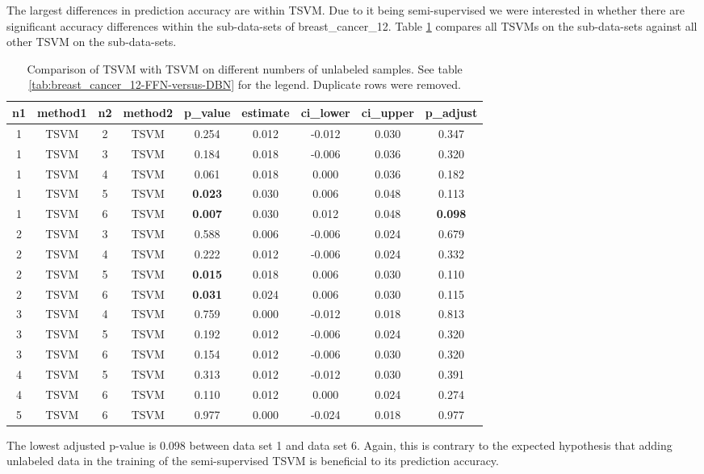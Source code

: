 The largest differences in prediction accuracy are within TSVM. Due
to it being semi-supervised we were interested in whether there are
significant accuracy differences within the sub-data-sets of breast\_cancer\_12.
Table \ref{tab:breast_cancer_12-TSVM-versus-TSVM} compares all TSVMs
on the sub-data-sets against all other TSVM on the sub-data-sets.

\begin{table}
\begin{centering}
\begin{tabular}{|c|c|c|c|c|c|c|c|c|}
\hline 
n1 & method1 & n2 & method2 & p\_value & estimate & ci\_lower & ci\_upper & p\_adjust\tabularnewline
\hline 
\hline 
1 & TSVM & 2 & TSVM & 0.254 & 0.012 & -0.012 & 0.030 & 0.347\tabularnewline
\hline 
1 & TSVM & 3 & TSVM & 0.184 & 0.018 & -0.006 & 0.036 & 0.320\tabularnewline
\hline 
1 & TSVM & 4 & TSVM & 0.061 & 0.018 & 0.000 & 0.036 & 0.182\tabularnewline
\hline 
1 & TSVM & 5 & TSVM & \textbf{0.023} & 0.030 & 0.006 & 0.048 & 0.113\tabularnewline
\hline 
1 & TSVM & 6 & TSVM & \textbf{0.007} & 0.030 & 0.012 & 0.048 & \textbf{0.098}\tabularnewline
\hline 
2 & TSVM & 3 & TSVM & 0.588 & 0.006 & -0.006 & 0.024 & 0.679\tabularnewline
\hline 
2 & TSVM & 4 & TSVM & 0.222 & 0.012 & -0.006 & 0.024 & 0.332\tabularnewline
\hline 
2 & TSVM & 5 & TSVM & \textbf{0.015} & 0.018 & 0.006 & 0.030 & 0.110\tabularnewline
\hline 
2 & TSVM & 6 & TSVM & \textbf{0.031} & 0.024 & 0.006 & 0.030 & 0.115\tabularnewline
\hline 
3 & TSVM & 4 & TSVM & 0.759 & 0.000 & -0.012 & 0.018 & 0.813\tabularnewline
\hline 
3 & TSVM & 5 & TSVM & 0.192 & 0.012 & -0.006 & 0.024 & 0.320\tabularnewline
\hline 
3 & TSVM & 6 & TSVM & 0.154 & 0.012 & -0.006 & 0.030 & 0.320\tabularnewline
\hline 
4 & TSVM & 5 & TSVM & 0.313 & 0.012 & -0.012 & 0.030 & 0.391\tabularnewline
\hline 
4 & TSVM & 6 & TSVM & 0.110 & 0.012 & 0.000 & 0.024 & 0.274\tabularnewline
\hline 
5 & TSVM & 6 & TSVM & 0.977 & 0.000 & -0.024 & 0.018 & 0.977\tabularnewline
\hline 
\end{tabular}
\par\end{centering}
\caption[Comparison of TSVM with TSVM on different numbers of unlabeled samples.]{\label{tab:breast_cancer_12-TSVM-versus-TSVM}Comparison of TSVM
with TSVM on different numbers of unlabeled samples. See table \ref{tab:breast_cancer_12-FFN-versus-DBN}
for the legend. Duplicate rows were removed.}
\end{table}

The lowest adjusted p-value is 0.098 between data set 1 and data set
6. Again, this is contrary to the expected hypothesis that adding
unlabeled data in the training of the semi-supervised TSVM is beneficial
to its prediction accuracy.

